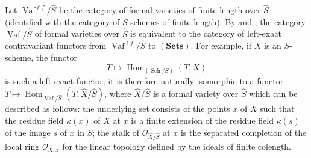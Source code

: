 Let \(\operatorname{Vaf}^{\ell f}/\widehat S\) be the category of
formal varieties of finite length over \(\widehat S\) (identified with
the category of \(S\)-schemes of finite length). By  and
, the category \(\operatorname{Vaf}/\widehat S\) of formal
varieties over \(\widehat S\) is equivalent to the category of
left-exact contravariant functors from
\(\operatorname{Vaf}^{\ell f}/\widehat S\) to \((\mathbf{Sets})\). For
example, if \(X\) is an \(S\)-scheme, the functor
\[
  T\longmapsto
  \operatorname{Hom}_{(\operatorname{Sch}/S)}(T,X)
\]
is such a left exact functor; it is therefore naturally isomorphic to a
functor
\(T\mapsto\operatorname{Hom}_{\operatorname{Vaf}/\widehat S}(T,\widehat X/\widehat S)\),
where \(\widehat X/\widehat S\) is a formal variety over \(\widehat S\)
which can be described as follows: the underlying set consists of the
points \(x\) of \(X\) such that the residue field \(\kappa(x)\) of \(X\)
at \(x\) is a finite extension of the residue field \(\kappa(s)\) of the
image \(s\) of \(x\) in \(S\); the stalk of
\(\mathcal O_{\widehat X/\widehat S}\) at \(x\) is the separated
completion of the local ring \(\mathcal O_{X,x}\) for the linear topology
defined by the ideals of finite colength.
